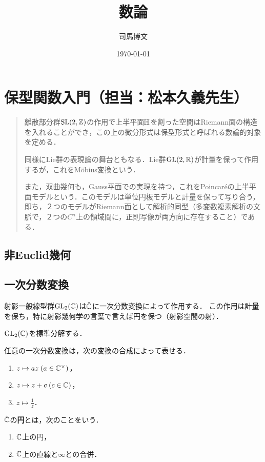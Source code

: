\documentclass[uplatex, 12pt, dvipdfmx]{jsreport}
\title{数論}
\author{司馬博文}
\date{\today}
\begin{document}
\tableofcontents

\chapter{保型関数入門（担当：松本久義先生）}

\begin{quotation}
    離散部分群$\mathrm{SL}(2,\mathbb{Z})$の作用で上半平面$\mathbb{H}$を割った空間はRiemann面の構造を入れることができ，この上の微分形式は保型形式と呼ばれる数論的対象を定める．

    同様にLie群の表現論の舞台ともなる．Lie群$\mathrm{GL}(2,\mathbb{R})$が計量を保って作用するが，これをMöbius変換という．

    また，双曲幾何も，Gauss平面での実現を持つ，これをPoincaréの上半平面モデルという．このモデルは単位円板モデルと計量を保って写り合う，即ち，２つのモデルがRiemann面として解析的同型（多変数複素解析の文脈で，２つの$C^n$上の領域間に，正則写像が両方向に存在すること）である．
\end{quotation}

\section{非Euclid幾何}

\section{一次分数変換}

\begin{screen}
    射影一般線型群$\GL_2(\C)$は$\hat{\mathbb{C}}$に一次分数変換によって作用する．
    この作用は計量を保ち，特に射影幾何学の言葉で言えば円を保つ（射影空間の射）．
\end{screen}

$\GL_2(\C)$を標準分解する．

\begin{theorem}[$\GL_2(\C)$の標準分解]\label{standard-decomposition-of-GL2C}
    任意の一次分数変換は，次の変換の合成によって表せる．
    \begin{enumerate}
        \item $z\mapsto az\;(a\in\mathbb{C}^\times)$，
        \item $z\mapsto z+c\;(c\in\mathbb{C})$，
        \item $z\mapsto\frac{1}{z}$．
    \end{enumerate}
\end{theorem}

\begin{definition}[circle]
    $\hat{\mathbb{C}}$の\textbf{円}とは，次のことをいう．
    \begin{enumerate}
        \item $\mathbb{C}$上の円，
        \item $\mathbb{C}$上の直線と$\infty$との合併．
    \end{enumerate}
\end{definition}
\end{document}
